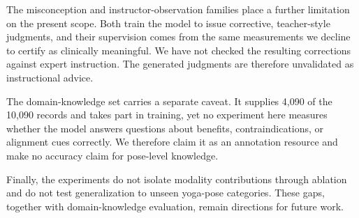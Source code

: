 The misconception and instructor-observation families place a further limitation on the present scope.
Both train the model to issue corrective, teacher-style judgments, and their supervision comes from the same measurements we decline to certify as clinically meaningful.
We have not checked the resulting corrections against expert instruction.
The generated judgments are therefore unvalidated as instructional advice.

The domain-knowledge set carries a separate caveat.
It supplies 4,090 of the 10,090 records and takes part in training, yet no experiment here measures whether the model answers questions about benefits, contraindications, or alignment cues correctly.
We therefore claim it as an annotation resource and make no accuracy claim for pose-level knowledge.

Finally, the experiments do not isolate modality contributions through ablation and do not test generalization to unseen yoga-pose categories.
These gaps, together with domain-knowledge evaluation, remain directions for future work.
